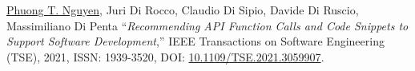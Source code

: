 \documentclass[a4paper,9pt]{article} %
\begin{document}
\begin{thebibliography}{100}
		
	
	

	
	
	
	
	
		
	\underline{Phuong T. Nguyen}, Juri Di Rocco, Claudio Di Sipio, Davide Di Ruscio, Massimiliano Di Penta ``\emph{Recommending API Function Calls and Code Snippets to Support Software Development},'' IEEE Transactions on Software Engineering (TSE), 2021, ISSN: 1939-3520, DOI: \href{https://doi.org/10.1109/TSE.2021.3059907}{10.1109/TSE.2021.3059907}.%
	
	

\end{thebibliography}
\end{document}
